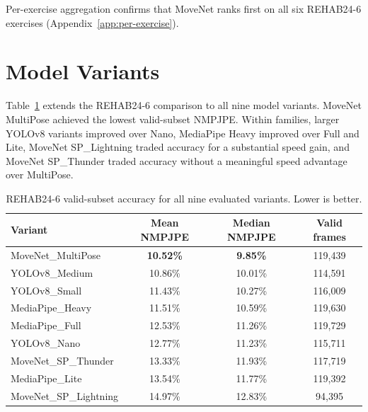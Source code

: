 Per-exercise aggregation confirms that MoveNet ranks first on all six REHAB24-6 exercises (Appendix~\ref{app:per-exercise}).

\section{Model Variants}
\label{sec:variant-results}

Table~\ref{tab:variant-accuracy} extends the REHAB24-6 comparison to all nine model variants. MoveNet MultiPose achieved the lowest valid-subset NMPJPE. Within families, larger YOLOv8 variants improved over Nano, MediaPipe Heavy improved over Full and Lite, MoveNet SP\_Lightning traded accuracy for a substantial speed gain, and MoveNet SP\_Thunder traded accuracy without a meaningful speed advantage over MultiPose.

\begin{table}[htbp]
  \centering
  \caption{REHAB24-6 valid-subset accuracy for all nine evaluated variants. Lower is better.}
  \label{tab:variant-accuracy}
  \begin{tabular}{lccc}
    \toprule
    Variant & Mean NMPJPE & Median NMPJPE & Valid frames \\
    \midrule
    MoveNet\_MultiPose     & \textbf{10.52\%} & \textbf{9.85\%} & 119{,}439 \\
    YOLOv8\_Medium         & 10.86\% & 10.01\% & 114{,}591 \\
    YOLOv8\_Small          & 11.43\% & 10.27\% & 116{,}009 \\
    MediaPipe\_Heavy       & 11.51\% & 10.59\% & 119{,}630 \\
    MediaPipe\_Full        & 12.53\% & 11.26\% & 119{,}729 \\
    YOLOv8\_Nano           & 12.77\% & 11.23\% & 115{,}711 \\
    MoveNet\_SP\_Thunder   & 13.33\% & 11.93\% & 117{,}719 \\
    MediaPipe\_Lite        & 13.54\% & 11.77\% & 119{,}392 \\
    MoveNet\_SP\_Lightning & 14.97\% & 12.83\% & 94{,}395 \\
    \bottomrule
  \end{tabular}
\end{table}

